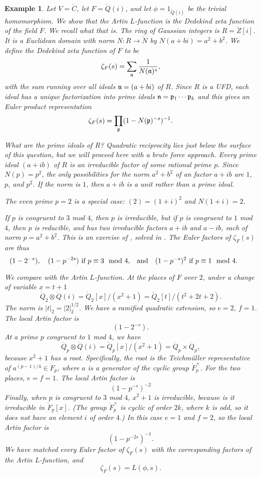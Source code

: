 \documentclass{amsart}
\newtheorem{example}[exercise]{Example}
\begin{document}
\begin{example}
Let $V=\ring{C}$, let $F=\ring{Q}(i)$, and let $\phi=1_{\ring{Q}(i)}$ be the trivial
homomorphism.  We show that the Artin $L$-function is the Dedekind zeta
function of the field $F$.  We recall what that is.
The ring of Gaussian integers is $R=\ring{Z}[i]$.  It is a Euclidean domain with
norm $N:R\to\ring{N}$ by $N(a+b i)=a^2 + b^2$.
We define the Dedekind zeta function of $F$ to be
\[
\zeta_F(s) = \sum_{\frak n} \frac{1}{N(\frak n)^s},
\]
with the sum running over all ideals ${\frak n} = (a+b i)$ of $R$. 
Since $R$ is a UFD, each ideal has a unique factorization into prime ideals
${\frak n} = {\frak p}_1\cdots {\frak p}_k$ and this gives an Euler product
representation
\[
\zeta_F(s) = \prod_{\frak p} (1- N({\frak p})^{-s})^{-1}.
\]

What are the prime ideals of $R$?  Quadratic reciprocity lies just
below the surface of this question, but we will proceed here with a brute
force approach.  Every prime ideal $(a+ib)$ of $R$ is an irreducible
factor of some rational prime $p$.  Since $N(p) = p^2$, the only
possibilities for the norm $a^2+b^2$ of an factor $a+ib$ are $1$, $p$,
and $p^2$.  If the norm is $1$, then $a+ib$ is a unit rather than a
prime ideal.

The even prime $p=2$ is a special case: $(2) = (1+i)^2$ and $N(1+i)=2$.  

If $p$ is congruent to $3$ mod $4$, then $p$ is irreducible,
but if $p$ is congruent to $1$ mod $4$, then $p$ is reducible, and
has two irreducible factors $a+ib$ and $a-ib$, each of norm $p=a^2+b^2$.
This is an exercise of \cite[p.~443]{knapp-basic}, solved in \cite{DF}.
The Euler factors of $\zeta_F(s)$ are thus
\[
(1-2^{-s}),\quad (1-p^{-2s}) \text{ if $p\equiv 3 \mod 4$,}
\quad\text{and}\quad (1-p^{-s})^2 \text{ if $p\equiv 1 \mod 4$.\quad\quad}
\]

We compare with the Artin $L$-function.  At the places of $F$ over $2$,
under a change of variable $x = t+1$
\[
\ring{Q}_2 \otimes \ring{Q}(i) = \ring{Q}_2[x]/(x^2+1) 
= \ring{Q}_2[t]/(t^2 + 2t + 2).
\]
The norm is $|t|_2 = |2|_2^{1/2}$.  We have a ramified quadratic
extension, so $e=2$, $f=1$.  The local Artin factor is
\[
(1-2^{-s}).
\]
At a prime $p$ congruent to $1$ mod $4$, we have
\[
\ring{Q}_p \otimes \ring{Q}(i) = \ring{Q}_p[x]/(x^2+1) = \ring{Q}_p\times \ring{Q}_p,
\]
because $x^2+1$ has a root.  Specifically, the root is the Teichm\"uller representative of
$a^{(p-1)/4}\in \ring{F}_p$, where $a$ is a generator of the cyclic
group $\ring{F}^\times_p$.  For the two places, $e=f=1$.  The local
Artin factor is
\[
(1-p^{-s})^{-2}
\]
Finally, when $p$ is congruent to $3$ mod $4$, $x^2+1$ is irreducible,
because is it irreducible in $\ring{F}_p[x]$.  (The group
$\ring{F}^\times_p$ is cyclic of order $2k$, where $k$ is odd, so it
does not have an element $i$ of order $4$.)  In this case $e=1$ and
$f=2$, so the local Artin factor is
\[
(1 - p^{-2s})^{-1}.
\]
We have matched every Euler factor of $\zeta_F(s)$ with the
corresponding factors of the Artin $L$-function, and
\[
\zeta_F(s) = L(\phi,s).
\]
\end{example}
\end{document}
